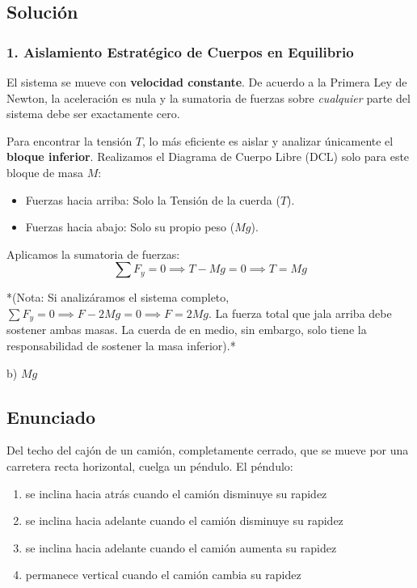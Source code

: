 \documentclass[12pt, a4paper]{article}
\begin{document}
\subsection*{Solución}

\subsubsection*{1. Aislamiento Estratégico de Cuerpos en Equilibrio}
El sistema se mueve con \textbf{velocidad constante}. De acuerdo a la Primera Ley de Newton, la aceleración es nula y la sumatoria de fuerzas sobre \textit{cualquier} parte del sistema debe ser exactamente cero.

Para encontrar la tensión $T$, lo más eficiente es aislar y analizar únicamente el \textbf{bloque inferior}.
Realizamos el Diagrama de Cuerpo Libre (DCL) solo para este bloque de masa $M$:
\begin{itemize}
    \item Fuerzas hacia arriba: Solo la Tensión de la cuerda ($T$).
    \item Fuerzas hacia abajo: Solo su propio peso ($Mg$).
\end{itemize}
Aplicamos la sumatoria de fuerzas:
$$ \sum F_y = 0 \implies T - Mg = 0 \implies T = Mg $$

*(Nota: Si analizáramos el sistema completo, $\sum F_y = 0 \implies F - 2Mg = 0 \implies F = 2Mg$. La fuerza total que jala arriba debe sostener ambas masas. La cuerda de en medio, sin embargo, solo tiene la responsabilidad de sostener la masa inferior).*

\begin{tcolorbox}[colback=green!5!white, colframe=green!50!black, title=Respuesta Final]
\centering \Large b) $Mg$
\end{tcolorbox}

\newpage

\subsection*{Enunciado}
Del techo del cajón de un camión, completamente cerrado, que se mueve por una carretera recta horizontal, cuelga un péndulo. El péndulo:
\begin{enumerate}[label=\alph*)]
    \item se inclina hacia atrás cuando el camión disminuye su rapidez
    \item se inclina hacia adelante cuando el camión disminuye su rapidez
    \item se inclina hacia adelante cuando el camión aumenta su rapidez
    \item permanece vertical cuando el camión cambia su rapidez
\end{enumerate}
\end{document}

